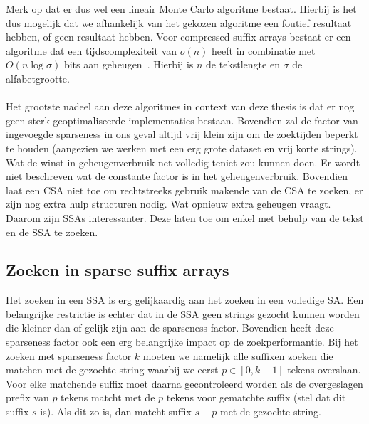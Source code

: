 Merk op dat er dus wel een lineair Monte Carlo algoritme bestaat.
Hierbij is het dus mogelijk dat we afhankelijk van het gekozen algoritme een foutief resultaat hebben, of geen resultaat hebben.
Voor compressed suffix arrays bestaat er een algoritme dat een tijdscomplexiteit van $o(n)$ heeft in combinatie met $O(n \log \sigma)$ bits aan geheugen~\cite{building_compressed_sa}.
Hierbij is $n$ de tekstlengte en $\sigma$ de alfabetgrootte.
\\ \\
Het grootste nadeel aan deze algoritmes in context van deze thesis is dat er nog geen sterk geoptimaliseerde implementaties bestaan.
Bovendien zal de factor van ingevoegde sparseness in ons geval altijd vrij klein zijn om de zoektijden beperkt te houden (aangezien we werken met een erg grote dataset en vrij korte strings).
Wat de winst in geheugenverbruik net volledig teniet zou kunnen doen.
Er wordt niet beschreven wat de constante factor is in het geheugenverbruik.
Bovendien laat een CSA niet toe om rechtstreeks gebruik makende van de CSA te zoeken, er zijn nog extra hulp structuren nodig.
Wat opnieuw extra geheugen vraagt.
Daarom zijn SSAs interessanter.
Deze laten toe om enkel met behulp van de tekst en de SSA te zoeken.

\subsection{Zoeken in sparse suffix arrays}
Het zoeken in een SSA is erg gelijkaardig aan het zoeken in een volledige SA\@.
Een belangrijke restrictie is echter dat in de SSA geen strings gezocht kunnen worden die kleiner dan of gelijk zijn aan de sparseness factor.
Bovendien heeft deze sparseness factor ook een erg belangrijke impact op de zoekperformantie.
Bij het zoeken met sparseness factor $k$ moeten we namelijk alle suffixen zoeken die matchen met de gezochte string waarbij we eerst $p \in [0, k-1]$ tekens overslaan.
Voor elke matchende suffix moet daarna gecontroleerd worden als de overgeslagen prefix van $p$ tekens matcht met de $p$ tekens voor gematchte suffix (stel dat dit suffix $s$ is).
Als dit zo is, dan matcht suffix $s-p$ met de gezochte string.